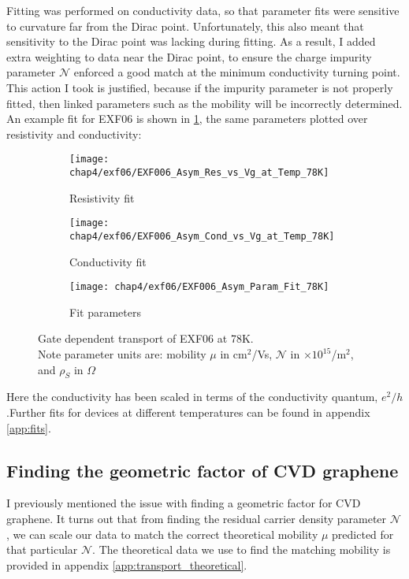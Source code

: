 \documentclass[../Matt_Gebert_Honours_Thesis.tex]{subfiles}
\begin{document}
Fitting was performed on conductivity data, so that parameter fits were sensitive to curvature far from the Dirac point. Unfortunately, this also meant that sensitivity to the Dirac point was lacking during fitting. As a result, I added extra weighting to data near the Dirac point, to ensure the charge impurity parameter $\mathcal{N}$ enforced a good match at the minimum conductivity turning point. This action I took is justified, because if the impurity parameter is not properly fitted, then linked parameters such as the mobility will be incorrectly determined. An example fit for EXF06 is shown in \cref{fig:exf06_78K_VgR}, the same parameters plotted over resistivity and conductivity:
\begin{figure}[H]
	\centering
	\begin{subfigure}{0.4\textwidth}
		\centering
		\texttt{[image: chap4/exf06/EXF006\_Asym\_Res\_vs\_Vg\_at\_Temp\_78K]}
		\caption{Resistivity fit}
	\end{subfigure}
	\begin{subfigure}{0.4\textwidth}
		\centering
		\texttt{[image: chap4/exf06/EXF006\_Asym\_Cond\_vs\_Vg\_at\_Temp\_78K]}
		\caption{Conductivity fit}
	\end{subfigure}
	\begin{subfigure}{0.16\textwidth}
		\centering
		\texttt{[image: chap4/exf06/EXF006\_Asym\_Param\_Fit\_78K]}
		\caption{Fit parameters}
	\end{subfigure}
	\caption[Gate dependent transport of EXF06]{Gate dependent transport of EXF06 at 78K. \\Note parameter units are: mobility $\mu$ in cm$^2$/Vs, $\mathcal{N}$ in $\times 10^{15}$/m$^2$, and $\rho_S$ in  $\Omega$}\label{fig:exf06_78K_VgR}
\end{figure}

Here the conductivity has been scaled in terms of the conductivity quantum, $e^2/h$ .Further fits for devices at different temperatures can be found in appendix \ref{app:fits}.

\subsection{Finding the geometric factor of CVD graphene}\label{sec:findinggeometricfactor}
I previously mentioned the issue with finding a geometric factor for CVD graphene. It turns out that from finding the residual carrier density parameter $\mathcal{N}$, we can scale our data to match the correct theoretical mobility $\mu$ predicted for that particular $\mathcal{N}$. The theoretical data we use to find the matching mobility is provided in appendix \ref{app:transport_theoretical}.
\end{document}
